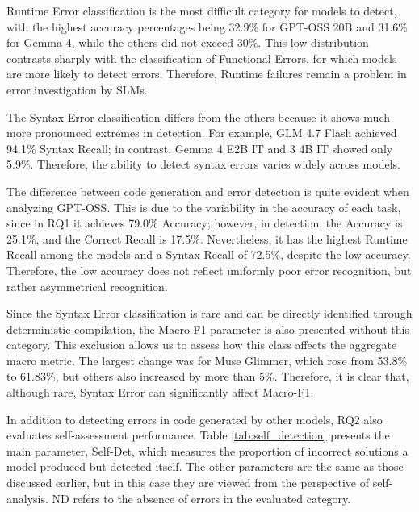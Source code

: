 Runtime Error classification is the most difficult category for models to detect, with the highest accuracy percentages being 32.9\% for GPT-OSS 20B and 31.6\% for Gemma 4, while the others did not exceed 30\%. This low distribution contrasts sharply with the classification of Functional Errors, for which models are more likely to detect errors. Therefore, Runtime failures remain a problem in error investigation by SLMs.

The Syntax Error classification differs from the others because it shows much more pronounced extremes in detection. For example, GLM 4.7 Flash achieved 94.1\% Syntax Recall; in contrast, Gemma 4 E2B IT and 3 4B IT showed only 5.9\%. Therefore, the ability to detect syntax errors varies widely across models.

The difference between code generation and error detection is quite evident when analyzing GPT-OSS. This is due to the variability in the accuracy of each task, since in RQ1 it achieves 79.0\% Accuracy; however, in detection, the Accuracy is 25.1\%, and the Correct Recall is 17.5\%. Nevertheless, it has the highest Runtime Recall among the models and a Syntax Recall of 72.5\%, despite the low accuracy. Therefore, the low accuracy does not reflect uniformly poor error recognition, but rather asymmetrical recognition.

Since the Syntax Error classification is rare and can be directly identified through deterministic compilation, the Macro-F1 parameter is also presented without this category. This exclusion allows us to assess how this class affects the aggregate macro metric. The largest change was for Muse Glimmer, which rose from 53.8\% to 61.83\%, but others also increased by more than 5\%. Therefore, it is clear that, although rare, Syntax Error can significantly affect Macro-F1.

In addition to detecting errors in code generated by other models, RQ2 also evaluates self-assessment performance. Table \ref{tab:self_detection} presents the main parameter, Self-Det, which measures the proportion of incorrect solutions a model produced but detected itself. The other parameters are the same as those discussed earlier, but in this case they are viewed from the perspective of self-analysis. ND refers to the absence of errors in the evaluated category.

